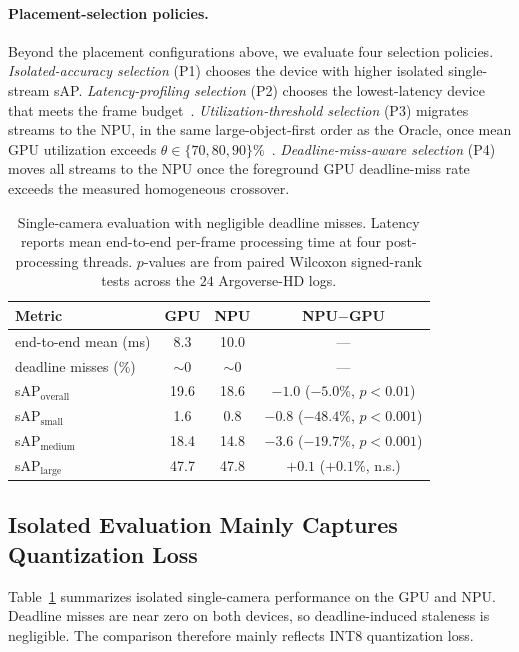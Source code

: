 \documentclass[runningheads]{llncs}
\begin{document}
\paragraph{\textbf{Placement-selection policies.}}
Beyond the placement configurations above, we evaluate four selection policies. \emph{Isolated-accuracy selection} (P1) chooses the device with higher isolated single-stream sAP. \emph{Latency-profiling selection} (P2) chooses the lowest-latency device that meets the frame budget~\cite{tod}. \emph{Utilization-threshold selection} (P3) migrates streams to the NPU, in the same large-object-first order as the Oracle, once mean GPU utilization exceeds $\theta\in\{70,80,90\}\%$~\cite{gandiva,horus}. \emph{Deadline-miss-aware selection} (P4) moves all streams to the NPU once the foreground GPU deadline-miss rate exceeds the measured homogeneous crossover.


\begin{table}[tbp]
\centering
\caption{Single-camera evaluation with negligible deadline misses. Latency reports mean end-to-end per-frame processing time at four post-processing threads. $p$-values are from paired Wilcoxon signed-rank tests across the $24$ Argoverse-HD logs.}
\label{tab:single-stream}
\footnotesize
\setlength{\tabcolsep}{5pt}
\begin{tabular}{lccc}
\toprule
Metric & GPU & NPU & NPU$-$GPU \\
\midrule
end-to-end mean (ms) & 8.3 & 10.0 & --- \\
deadline misses (\%) & $\sim\!0$ & $\sim\!0$ & --- \\
sAP$_{\text{overall}}$ & 19.6 & 18.6 & $-1.0$ ($-5.0\%$, $p<0.01$) \\
sAP$_{\text{small}}$  & 1.6 & 0.8 & $-0.8$ ($-48.4\%$, $p<0.001$) \\
sAP$_{\text{medium}}$ & 18.4 & 14.8 & $-3.6$ ($-19.7\%$, $p<0.001$) \\
sAP$_{\text{large}}$  & 47.7 & 47.8 & $+0.1$ ($+0.1\%$, n.s.) \\
\bottomrule
\end{tabular}
\end{table}

\subsection{Isolated Evaluation Mainly Captures Quantization Loss}
\label{sec:results:single}

Table~\ref{tab:single-stream} summarizes isolated single-camera performance on the GPU and NPU. Deadline misses are near zero on both devices, so deadline-induced staleness is negligible. The comparison therefore mainly reflects INT8 quantization loss.
\end{document}
